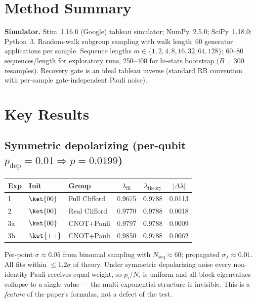 \documentclass[11pt]{article}
\begin{document}
\section{Method Summary}
\textbf{Simulator.} Stim~1.16.0 (Google) tableau simulator; NumPy~2.5.0;
SciPy~1.18.0; Python~3. Random-walk subgroup sampling with walk length~60
generator applications per sample. Sequence lengths
$m \in \{1,2,4,8,16,32,64,128\}$; 60--80 sequences/length for exploratory runs,
250--400 for hi-stats bootstrap ($B=300$ resamples). Recovery gate is an ideal
tableau inverse (standard RB convention with per-sample gate-independent
Pauli noise).

\section{Key Results}

\subsection{Symmetric depolarizing (per-qubit $p_{\mathrm{dep}}=0.01 \Rightarrow p=0.0199$)}
\begin{center}
\begin{tabular}{lllccc}
\toprule
Exp & Init & Group & $\lambda_{\mathrm{fit}}$ & $\lambda_{\mathrm{theory}}$ & $|\Delta\lambda|$ \\
\midrule
1  & $\ket{00}$ & Full Clifford & 0.9675 & 0.9788 & 0.0113 \\
2  & $\ket{00}$ & Real Clifford & 0.9770 & 0.9788 & 0.0018 \\
3a & $\ket{00}$ & CNOT+Pauli    & 0.9797 & 0.9788 & 0.0009 \\
3b & $\ket{++}$ & CNOT+Pauli    & 0.9850 & 0.9788 & 0.0062 \\
\bottomrule
\end{tabular}
\end{center}
Per-point $\sigma \approx 0.05$ from binomial sampling with $N_{\mathrm{seq}}\approx 60$;
propagated $\sigma_\lambda \approx 0.01$. All fits within $\le 1.2\sigma$ of theory.
Under symmetric depolarizing noise every non-identity Pauli receives equal weight,
so $p_i/N_i$ is uniform and all block eigenvalues collapse to a single value
--- the multi-exponential structure is invisible. This is a \emph{feature} of
the paper's formulas, not a defect of the test.
\end{document}
